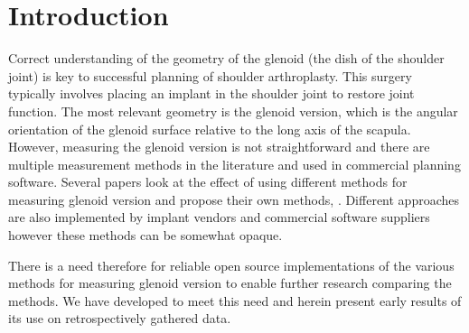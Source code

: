 \section{Introduction}
\label{sec:introduction}
Correct understanding of the geometry of the glenoid (the dish of the shoulder joint) is
key to successful planning of shoulder arthroplasty. This surgery typically involves
placing an implant in the shoulder joint to restore joint function. The most relevant
geometry is the glenoid version, which is the angular orientation of the glenoid surface
relative to the long axis of the scapula. However, measuring the glenoid version is not
straightforward and there are multiple measurement methods in the literature and used in
commercial planning software. Several papers look at the effect of using 
different methods for measuring glenoid version and propose their own 
methods, \cite{PMID:33330245, PMID:32010231, PMID:29298261, PMID:33554174}. 
Different approaches are also implemented by implant vendors and commercial 
software suppliers \cite{blueprint, exactech, djosurgical} however these methods can 
be somewhat opaque.

There is a need therefore for reliable open source implementations of the various 
methods for measuring glenoid version to enable further research comparing the methods. 
We have developed \sksglenoid to meet this need and herein present early results of its 
use on retrospectively gathered data.
